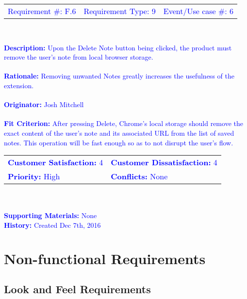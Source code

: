 \documentclass[12pt, titlepage]{article}
\begin{document}
\begin{framed}
	
	\begin{center}
		
		\begin{tabular}{ l c r }
			\textcolor{blue}{Requirement \#: F.6} & 
			\textcolor{blue}{Requirement Type: 9} & \textcolor{blue}{Event/Use 
			case \#: 6}\\
		\end{tabular} \\
	\end{center}
	\textcolor{blue}{\textbf{Description:} Upon the Delete Note button being 
	clicked, the product must remove the user's note from local browser 
	storage.\\
	\\
	\textbf{Rationale:} Removing unwanted Notes greatly increases the 
	usefulness of the extension. \\
	\\
	\textbf{Originator:} Josh Mitchell \\
	\\
	\textbf{Fit Criterion:} After pressing Delete, Chrome's local storage 
	should remove the exact content of the user's note and its associated URL 
	from the list of saved notes. This operation will be fast enough so as to 
	not disrupt the user's flow.}
	\\
	
	\begin{tabular}{ll}
		\textcolor{blue}{\textbf{Customer Satisfaction:} 4 }& 
		\textcolor{blue}{\textbf{Customer Dissatisfaction:} 
		4 }\\
		\textcolor{blue}{\textbf{Priority:} High} & 
		\textcolor{blue}{\textbf{Conflicts:} None}\\
	\end{tabular} \\
	\\
	\textcolor{blue}{\textbf{Supporting Materials:} None \\
	\textbf{History:} Created Dec 7th, 2016}
	
\end{framed}

\section{Non-functional Requirements}

\subsection{Look and Feel Requirements}
\end{document}
